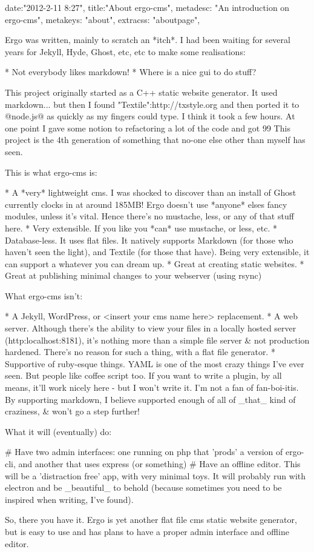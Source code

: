 {
date:"2012-2-11 8:27",
title:"About ergo-cms",
metadesc: "An introduction on ergo-cms",
metakeys: "about",
extracss: "aboutpage",
}

Ergo was written, mainly to scratch an *itch*. I had been waiting for several years for Jekyll, Hyde, Ghost, etc, etc to make some realisations:

* Not everybody likes markdown!
* Where is a nice gui to do stuff?

This project originally started as a C++ static website generator. It used markdown... but then I found "Textile":http://txstyle.org and then ported it to @node.js@ as quickly as my fingers could type. I think it took a few hours. At one point I gave some notion to refactoring a lot of the code and got 99%
This project is the 4th generation of something that no-one else other than myself has seen.


This is what ergo-cms is:

* A *very* lightweight cms. I was shocked to discover than an install of Ghost currently clocks in at around 185MB! Ergo doesn't use *anyone* elses fancy modules, unless it's vital. Hence there's no mustache, less, or any of that stuff here. 
* Very extensible. If you like you *can* use mustache, or less, etc.
* Database-less. It uses flat files. It natively supports Markdown (for those who haven't seen the light), and Textile (for those that have). Being very extensible, it can support a whatever you can dream up.
* Great at creating static websites. 
* Great at publishing minimal changes to your webserver (using rsync)


What ergo-cms isn't:

* A Jekyll, WordPress, or <insert your cms name here> replacement.
* A web server. Although there's the ability to view your files in a locally hosted server (http:localhost:8181), it's nothing more than a simple file server & not production hardened. There's no reason for such a thing, with a flat file generator.
* Supportive of ruby-esque things. YAML is one of the most crazy things I've ever seen. But people like coffee script too. If you want to write a plugin, by all means, it'll work nicely here - but I won't write it. I'm not a fan of fan-boi-itis. By supporting markdown, I believe supported enough of all of _that_ kind of craziness, & won't go a step further!

What it will (eventually) do:

# Have two admin interfaces: one running on php that 'prods' a version of ergo-cli, and another that uses express (or something)
# Have an offline editor. This will be a 'distraction free' app, with very minimal toys. It will probably run with electron and be _beautiful_ to behold (because sometimes you need to be inspired when writing, I've found).


So, there you have it. Ergo is yet another flat file cms static website generator, but is easy to use and has plans to have a proper admin interface and offline editor.

